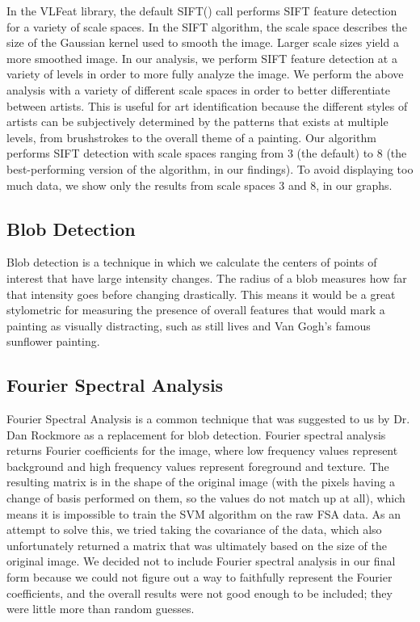 \documentclass{article}
\begin{document}
  In the VLFeat library, the default SIFT() call performs SIFT feature detection
  for a variety of scale spaces. In the SIFT algorithm, the scale space
  describes the size of the Gaussian kernel used to smooth the image. Larger
  scale sizes yield a more smoothed image. In our analysis, we perform SIFT
  feature detection at a variety of levels in order to more fully analyze the
  image. We perform the above analysis with a variety of different scale spaces
  in order to better differentiate between artists. This is useful for art
  identification because
  the different styles of artists can be subjectively determined by the patterns
  that exists at multiple levels, from brushstrokes to the overall theme of a
  painting. Our algorithm performs SIFT detection with scale spaces ranging from
  3 (the default) to 8 (the best-performing version of the algorithm, in our
  findings). To avoid displaying too much data, we show only the results from
  scale spaces 3 and 8, in our graphs. 

  \subsection{Blob Detection}
  Blob detection is a technique in which we calculate the centers of points of
  interest that have large intensity changes. The radius of a blob measures
  how far that intensity goes before changing drastically. This means it would
  be a great stylometric for measuring the presence of overall features that
  would mark a painting as visually distracting, such as still lives and Van
  Gogh's famous sunflower painting. \\

  \subsection{Fourier Spectral Analysis}
  Fourier Spectral Analysis is a common technique that was suggested to us by
  Dr. Dan Rockmore as a replacement for blob detection. Fourier spectral
  analysis returns Fourier coefficients for the image, where low frequency
  values represent background and high frequency values represent foreground
  and texture. The resulting matrix is in the shape of the original image
  (with the pixels having a change of basis performed on them, so the values
  do not match up at all), which means it is impossible to train the SVM
  algorithm on the raw FSA data. As an attempt to solve this, we tried taking
  the covariance of the data, which also unfortunately returned a matrix that
  was ultimately based on the size of the original image. We decided not to include Fourier spectral analysis in our final form
  because we could not figure out a way to faithfully represent the Fourier
  coefficients, and the overall results were not good enough to be included;
  they were little more than random guesses.
\end{document}

